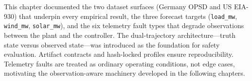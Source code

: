 This chapter documented the two dataset surfaces (Germany OPSD and US EIA-930)
that underpin every empirical result, the three forecast targets (\texttt{load\_mw},
\texttt{wind\_mw}, \texttt{solar\_mw}), and the six telemetry fault types that
degrade observations between the plant and the controller.  The dual-trajectory
architecture---truth state versus observed state---was introduced as the
foundation for safety evaluation.  Artifact contracts and hash-locked profiles
ensure reproducibility.  Telemetry faults are treated as ordinary operating
conditions, not edge cases, motivating the observation-aware machinery
developed in the following chapters.
